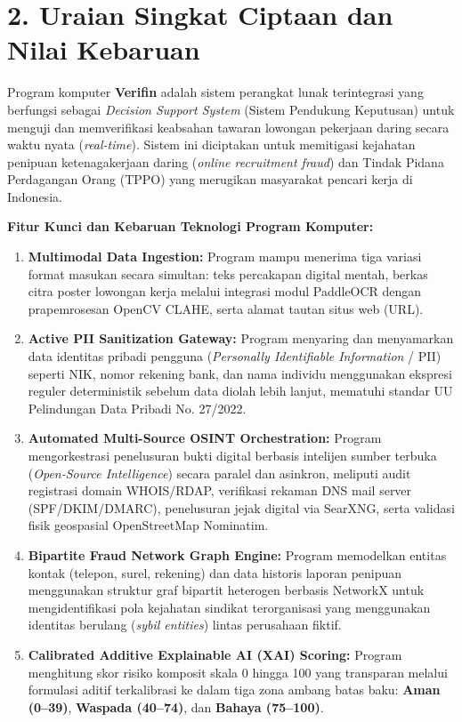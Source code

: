 \documentclass[11pt,a4paper]{article}
\begin{document}
\vspace{0.8em}
\section*{2. Uraian Singkat Ciptaan dan Nilai Kebaruan}

Program komputer \textbf{Verifin} adalah sistem perangkat lunak terintegrasi yang berfungsi sebagai \textit{Decision Support System} (Sistem Pendukung Keputusan) untuk menguji dan memverifikasi keabsahan tawaran lowongan pekerjaan daring secara waktu nyata (\textit{real-time}). Sistem ini diciptakan untuk memitigasi kejahatan penipuan ketenagakerjaan daring (\textit{online recruitment fraud}) dan Tindak Pidana Perdagangan Orang (TPPO) yang merugikan masyarakat pencari kerja di Indonesia.

\textbf{Fitur Kunci dan Kebaruan Teknologi Program Komputer:}
\begin{enumerate}
    \item \textbf{Multimodal Data Ingestion:} Program mampu menerima tiga variasi format masukan secara simultan: teks percakapan digital mentah, berkas citra poster lowongan kerja melalui integrasi modul PaddleOCR dengan prapemrosesan OpenCV CLAHE, serta alamat tautan situs web (URL).
    \item \textbf{Active PII Sanitization Gateway:} Program menyaring dan menyamarkan data identitas pribadi pengguna (\textit{Personally Identifiable Information} / PII) seperti NIK, nomor rekening bank, dan nama individu menggunakan ekspresi reguler deterministik sebelum data diolah lebih lanjut, mematuhi standar UU Pelindungan Data Pribadi No. 27/2022.
    \item \textbf{Automated Multi-Source OSINT Orchestration:} Program mengorkestrasi penelusuran bukti digital berbasis intelijen sumber terbuka (\textit{Open-Source Intelligence}) secara paralel dan asinkron, meliputi audit registrasi domain WHOIS/RDAP, verifikasi rekaman DNS mail server (SPF/DKIM/DMARC), penelusuran jejak digital via SearXNG, serta validasi fisik geospasial OpenStreetMap Nominatim.
    \item \textbf{Bipartite Fraud Network Graph Engine:} Program memodelkan entitas kontak (telepon, surel, rekening) dan data historis laporan penipuan menggunakan struktur graf bipartit heterogen berbasis NetworkX untuk mengidentifikasi pola kejahatan sindikat terorganisasi yang menggunakan identitas berulang (\textit{sybil entities}) lintas perusahaan fiktif.
    \item \textbf{Calibrated Additive Explainable AI (XAI) Scoring:} Program menghitung skor risiko komposit skala 0 hingga 100 yang transparan melalui formulasi aditif terkalibrasi ke dalam tiga zona ambang batas baku: \textbf{Aman (0--39)}, \textbf{Waspada (40--74)}, dan \textbf{Bahaya (75--100)}.
\end{enumerate}
\end{document}
